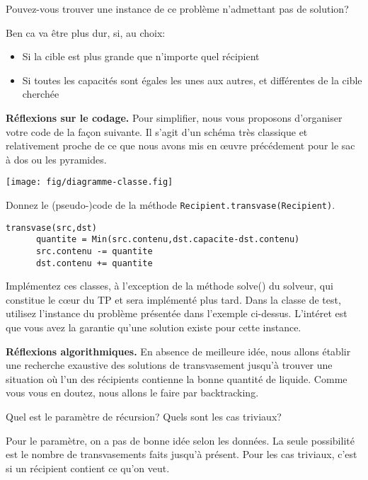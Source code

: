 \documentclass[10pt]{article}\usepackage[correction,nu]{esial}%
\begin{document}
\Question Pouvez-vous trouver une instance de ce problème n'admettant pas de
solution?
\begin{Reponse}
  \noindent
  Ben ca va être plus dur, si, au choix:
  \begin{itemize}
  \item Si la cible est plus grande que n'importe quel récipient
  \item Si toutes les capacités sont égales les unes aux autres, et différentes
    de la cible cherchée
  \end{itemize}
\end{Reponse}

\Exercice\textbf{Réflexions sur le codage.}  Pour simplifier, nous vous
proposons d'organiser votre code de la façon suivante. Il s'agit d'un schéma
très classique et relativement proche de ce que nous avons mis en œuvre
précédement pour le sac à dos ou les pyramides.

\noindent\texttt{[image: fig/diagramme-classe.fig]}

\Question Donnez le (pseudo-)code de la méthode \texttt{Recipient.transvase(Recipient)}.

\begin{Reponse}
  \begin{Verbatim}[gobble=4]
    transvase(src,dst)
      quantite = Min(src.contenu,dst.capacite-dst.contenu)
      src.contenu -= quantite
      dst.contenu += quantite
  \end{Verbatim}
\end{Reponse}
\Question Implémentez ces classes, à l'exception de la méthode solve() du
solveur, qui constitue le cœur du TP et sera implémenté plus tard. Dans la
classe de test, utilisez l'instance du problème présentée dans l'exemple
ci-dessus. L'intéret est que vous avez la garantie qu'une solution existe pour
cette instance.

\Exercice\textbf{Réflexions algorithmiques.}  En absence de meilleure idée, nous
allons établir une recherche exaustive des solutions de transvasement jusqu'à
trouver une situation où l'un des récipients contienne la bonne quantité de
liquide. Comme vous vous en doutez, nous allons le faire par backtracking.

\Question Quel est le paramètre de récursion? Quels sont les cas triviaux?

\begin{Reponse}
  Pour le paramètre, on a pas de bonne idée selon les données. La seule
  possibilité est le nombre de transvasements faits jusqu'à présent. 
  Pour les cas triviaux, c'est si un récipient contient ce qu'on veut.
\end{Reponse}
\end{document}
